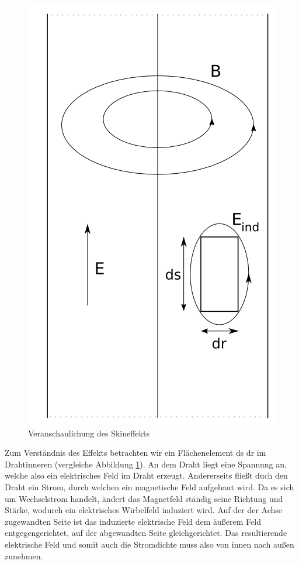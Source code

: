 \begin{figure}[tbhn]
\begin{center}
\noindent
\includegraphics[scale=0.5]{Skineffekt.png}
\end{center}
\caption{Veranschaulichung des Skineffekts} %
\label{pic:skineffekt}
\end{figure}

Zum Verständnis des Effekts betrachten wir ein Flächenelement ds dr im Drahtinneren (vergleiche Abbildung \ref{pic:skineffekt}).
An dem Draht liegt eine Spannung an, welche also ein elektrisches Feld im Draht erzeugt.
Andererseits fließt duch den Draht ein Strom, durch welchen ein magnetische Feld aufgebaut wird.
Da es sich um Wechselstrom handelt, ändert das Magnetfeld ständig seine Richtung und Stärke, wodurch ein elektrisches Wirbelfeld induziert wird.
Auf der der Achse zugewandten Seite ist das induzierte elektrische Feld dem äußerem Feld entgegengerichtet, auf der abgewandten Seite gleichgerichtet.
Das resultierende elektrische Feld und somit auch die Stromdichte muss also von innen nach außen zunehmen.\cite{Gerthsen}

